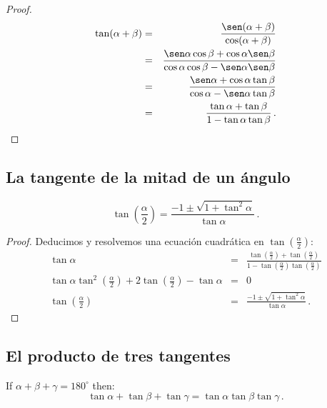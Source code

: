 \begin{proof}

\begin{eqnarray*}
\tan (\alpha+\beta) &=& \frac{\sen(\alpha+\beta)}{\cos(\alpha+\beta)}\\
&=&\frac{\sen\alpha\cos\beta+\cos\alpha\sen\beta}{\cos\alpha\cos\beta-\sen\alpha\sen\beta}\\
&=&\frac{\sen\alpha+\cos\alpha\tan\beta}{\cos\alpha-\sen\alpha\tan\beta}\\
&=&\frac{\tan\alpha+\tan\beta}{1-\tan\alpha\tan\beta}\,.
\end{eqnarray*}

\end{proof}


\subsection{La tangente de la mitad de un ángulo}\label{s.tangent-half}
\begin{theorem}\label{thm.tangent-half}
\[
\tan\left(\frac{\alpha}{2}\right) = \frac{-1\pm\sqrt{1+\tan^2\alpha}}{\tan\alpha}\,.
\]
\end{theorem}
\begin{proof}
Deducimos y resolvemos una ecuación cuadrática en $\displaystyle\tan\left(\displaystyle\frac{\alpha}{2}\right)$:
\begin{displaymath}
\begin{array}{lll}
\tan \alpha&=&\displaystyle\frac{
  \tan\left(\displaystyle\frac{\alpha}{2}\right)+
  \tan\left(\displaystyle\frac{\alpha}{2}\right)
  }{
  1-\tan\left(\displaystyle\frac{\alpha}{2}\right)
    \tan\left(\displaystyle\frac{\alpha}{2}\right)
  }\\
\tan\alpha \tan^2  \left(\displaystyle\frac{\alpha}{2}\right) + 2 \tan \left(\displaystyle\frac{\alpha}{2}\right) -\tan\alpha &=&0\\
\tan\left(\displaystyle\frac{\alpha}{2}\right) &=& \displaystyle\frac{-1\pm\sqrt{1+\tan^2\alpha}}{\tan\alpha}\,.
\end{array}
\end{displaymath}
\end{proof}


\subsection{El producto de tres tangentes}\label{s.tangent-three}
\begin{theorem}\label{thm.tangent3}
If $\alpha+\beta+\gamma=180^\circ$ then:
\[
\tan\alpha+\tan\beta+\tan\gamma = \tan\alpha\tan\beta\tan\gamma\,.
\]
\end{theorem}

